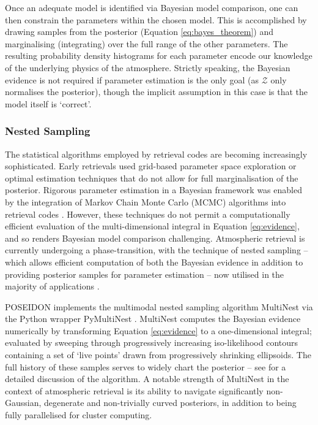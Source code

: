\documentclass[fleqn,usenatbib]{mnras}
\begin{document}
Once an adequate  model is identified via Bayesian model comparison, one can then constrain the parameters within the chosen model. This is accomplished by drawing samples from the posterior (Equation \ref{eq:bayes_theorem}) and marginalising (integrating) over the full range of the other parameters. The resulting probability density histograms for each parameter encode our knowledge of the underlying physics of the atmosphere. Strictly speaking, the Bayesian evidence is not required if parameter estimation is the only goal (as $\mathcal{Z}$ only normalises the posterior), though the implicit assumption in this case is that the model itself is `correct'.

\subsubsection{Nested Sampling}\label{subsubsec:nested_sampling}

The statistical algorithms employed by retrieval codes are becoming increasingly sophisticated. Early retrievals used grid-based parameter space exploration \citep{Madhusudhan2009} or optimal estimation techniques \citep{Lee2012,Line2012,Barstow2013} that do not allow for full marginalisation of the posterior. Rigorous parameter estimation in a Bayesian framework was enabled by the integration of Markov Chain Monte Carlo (MCMC) algorithms into retrieval codes \citep[e.g.][]{Madhusudhan2011,Benneke2012,Line2013}. However, these techniques do not permit a computationally efficient evaluation of the multi-dimensional integral in Equation \ref{eq:evidence}, and so renders Bayesian model comparison challenging. Atmospheric retrieval is currently undergoing a phase-transition, with the technique of nested sampling \citep{Skilling2004} -- which allows efficient computation of both the Bayesian evidence in addition to providing posterior samples for parameter estimation -- now utilised in the majority of applications \citep{Benneke2013,Benneke2015,Waldmann2015a,Line2016a,Lupu2016a,Lavie2016}.

POSEIDON implements the multimodal nested sampling algorithm MultiNest \citep{Feroz2008,Feroz2009,Feroz2013} via the Python wrapper PyMultiNest \citep{Buchner2014}. MultiNest computes the Bayesian evidence numerically by transforming Equation \ref{eq:evidence} to a one-dimensional integral; evaluated by sweeping through progressively increasing iso-likelihood contours containing a set of `live points' drawn from progressively shrinking ellipsoids. The full history of these samples serves to widely chart the posterior -- see \citet{Benneke2013} for a detailed discussion of the algorithm. A notable strength of MultiNest in the context of atmospheric retrieval is its ability to navigate significantly non-Gaussian, degenerate and non-trivially curved posteriors, in addition to being fully parallelised for cluster computing.
\end{document}
